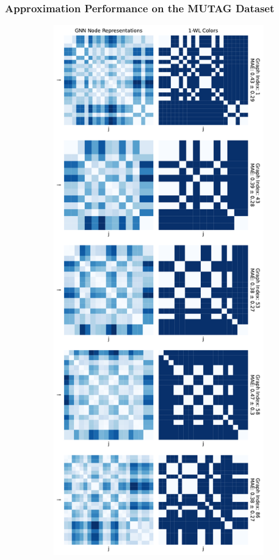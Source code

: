 \subsubsection{\gnn Approximation Performance on the MUTAG Dataset}
\begin{figure}[H]
    \centering
    \begin{subfigure}[b]{0.45992852703\textwidth}
        \centering
        \includegraphics[width=\textwidth, left]{Figures/heatmaps_MUTAG_0.pdf}

\end{subfigure}
\end{figure}
